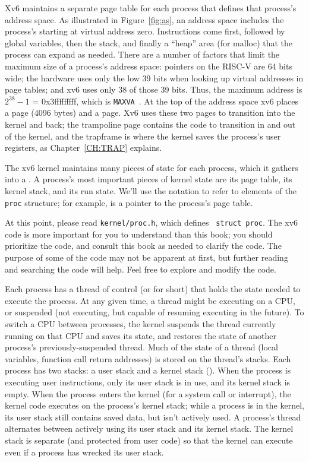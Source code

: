 Xv6 maintains a separate page table for each process that defines that process's
address space. As illustrated in 
Figure~\ref{fig:as},
an address space includes the process's
starting at virtual address zero. Instructions come first,
followed by global variables, then the stack,
and finally a ``heap'' area (for malloc)
that the process can expand as needed.
There are a number of factors that limit the
maximum size of a process's address space:
pointers on the RISC-V are 64 bits wide;
the hardware uses only the low 39 bits when
looking up virtual addresses in page tables;
and xv6 uses only 38 of those 39 bits.
Thus, the maximum address is $2^{38}-1$ =
0x3fffffffff, which is \lstinline{MAXVA}~.
At the top of the address space xv6 places
a  page (4096 bytes)
and a  page.  Xv6 uses these two pages
to transition into the kernel and back;
the trampoline page contains the code to transition in and out
of the kernel, and the trapframe is where the kernel saves
the process's user registers,
as Chapter~\ref{CH:TRAP} explains.

The xv6 kernel maintains many pieces of state for each process,
which it gathers into a
.
A process's most important pieces of kernel state are its 
page table, its kernel stack, and its run state.
We'll use the notation
to refer to elements of the
\lstinline{proc}
structure; for example,
 is a pointer to the process's page table.

At this point, please read {\tt kernel/proc.h}, which defines {\tt
  struct proc}. The xv6 code is more important for you to understand
than this book; you should prioritize the code, and consult this book
as needed to clarify the code. The purpose of some of the code may not
be apparent at first, but further reading and searching the code will
help. Feel free to explore and modify the code.

Each process has a thread of control (or 
for short) that holds the state needed to execute the process.
At any given time, a thread might be executing on a CPU,
or suspended (not executing, but capable of resuming executing
in the future).
To switch a CPU between processes,
the kernel suspends the thread currently running on that CPU
and saves its state,
and restores the state of another process's previously-suspended
thread.  Much of the state of a thread (local variables, function call return
addresses) is stored on the thread's stacks.
Each process has two stacks: a user stack and a kernel stack
().
When the process is executing user instructions, only its user stack
is in use, and its kernel stack is empty.
When the process enters the kernel (for a system call or interrupt),
the kernel code executes on the process's kernel stack; while
a process is in the kernel, its user stack still contains saved
data, but isn't actively used.
A process's thread alternates between actively using its user stack
and its kernel stack. The kernel stack is separate (and protected from
user code) so that the kernel
can execute even if a process has wrecked its user stack.

